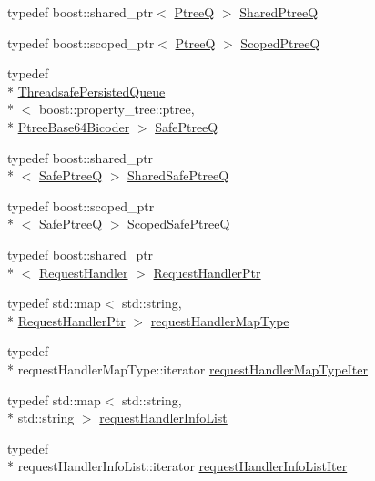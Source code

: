 \begin{DoxyCompactItemize}
typedef boost\-::shared\-\_\-ptr$<$ \hyperlink{a00089_af1d6724570f46ac378171bd45ddf6903}{Ptree\-Q} $>$ \hyperlink{a00089_aecf9f29bb4c41e0d4dbc74731a3020cd}{Shared\-Ptree\-Q}
\item 
typedef boost\-::scoped\-\_\-ptr$<$ \hyperlink{a00089_af1d6724570f46ac378171bd45ddf6903}{Ptree\-Q} $>$ \hyperlink{a00089_a64a7093fe1bdc3f323b469e800eebc7f}{Scoped\-Ptree\-Q}
\item 
typedef \\*
\hyperlink{a00045}{Threadsafe\-Persisted\-Queue}\\*
$<$ boost\-::property\-\_\-tree\-::ptree, \\*
\hyperlink{a00036}{Ptree\-Base64\-Bicoder} $>$ \hyperlink{a00089_ac48ab954f4898861f383b80e857e17cc}{Safe\-Ptree\-Q}
\item 
typedef boost\-::shared\-\_\-ptr\\*
$<$ \hyperlink{a00089_ac48ab954f4898861f383b80e857e17cc}{Safe\-Ptree\-Q} $>$ \hyperlink{a00089_ae95e969e7f5dfd1f36842ac9aa25c7ea}{Shared\-Safe\-Ptree\-Q}
\item 
typedef boost\-::scoped\-\_\-ptr\\*
$<$ \hyperlink{a00089_ac48ab954f4898861f383b80e857e17cc}{Safe\-Ptree\-Q} $>$ \hyperlink{a00089_a20653e6629a85affc6a1b8529e0a8da0}{Scoped\-Safe\-Ptree\-Q}
\item 
typedef boost\-::shared\-\_\-ptr\\*
$<$ \hyperlink{a00037}{Request\-Handler} $>$ \hyperlink{a00089_a21e40edcd4f1a3c7c1cc0015b576c8e5}{Request\-Handler\-Ptr}
\item 
typedef std\-::map$<$ std\-::string, \\*
\hyperlink{a00089_a21e40edcd4f1a3c7c1cc0015b576c8e5}{Request\-Handler\-Ptr} $>$ \hyperlink{a00089_acaaba8d5ee3dd772dbf008749245c357}{request\-Handler\-Map\-Type}
\item 
typedef \\*
request\-Handler\-Map\-Type\-::iterator \hyperlink{a00089_acb02d872f8089cccfccea0cbf2191a76}{request\-Handler\-Map\-Type\-Iter}
\item 
typedef std\-::map$<$ std\-::string, \\*
std\-::string $>$ \hyperlink{a00089_a403fe12b3fa48680ec27f8af4286383b}{request\-Handler\-Info\-List}
\item 
typedef \\*
request\-Handler\-Info\-List\-::iterator \hyperlink{a00089_a9b5b819d32c8f71acb0a5b292303b8e1}{request\-Handler\-Info\-List\-Iter}
\item 

\end{DoxyCompactItemize}
